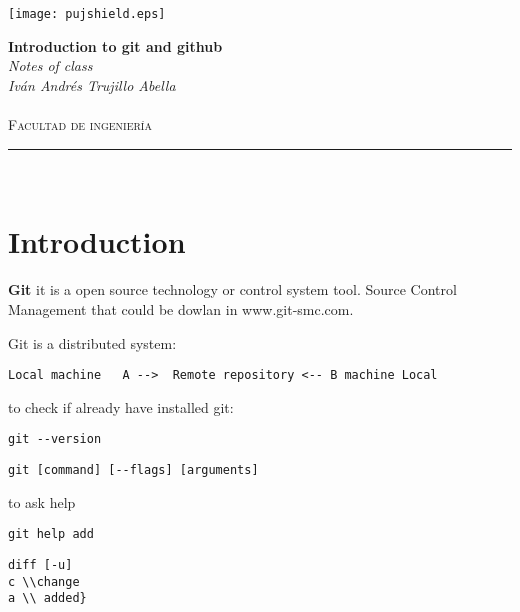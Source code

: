 \documentclass[10pt,a4paper]{article}
\author{Iván Andrés Trujillo }
\begin{document}
\newcommand{\HRule}{\rule{\linewidth}{0.5mm}}


\graphicspath{{/home/ces/Pictures/puj/}}
\texttt{[image: pujshield.eps]}\\[0.5cm] 

\begin{center} 
\textbf{\LARGE Introduction to git and github}\\[0.2cm]
\emph{\LARGE Notes of class}\\[0.3cm] 
\emph{Iván Andrés Trujillo Abella} \\
\textsc{\Large 
}\\[0.2cm] 
\textsc{\large Facultad de ingeniería}\\[0.5cm] 
\HRule \\[0.4cm]
\end{center}
\vspace{1cm}
\section{Introduction}





\textbf{Git} it is a open source technology 
or control system tool.  Source Control Management that could be dowlan in www.git-smc.com.



Git is a distributed system:
\begin{verbatim}
Local machine   A -->  Remote repository <-- B machine Local 
\end{verbatim}



to check if already have installed git:
\begin{verbatim}
git --version
\end{verbatim}
 

\begin{verbatim}
git [command] [--flags] [arguments]
\end{verbatim}

to ask help

\begin{verbatim}
git help add
\end{verbatim}

 \begin{verbatim}
diff [-u]
c \\change
a \\ added}
\end{verbatim}
\end{document}
